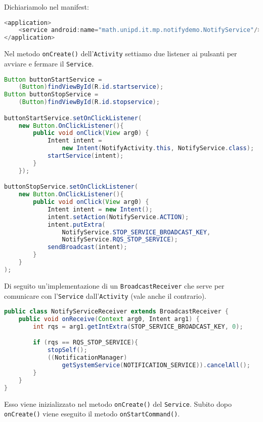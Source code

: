 Dichiariamolo nel manifest:
\begin{lstlisting}[language=Java]
<application>
	<service android:name="math.unipd.it.mp.notifydemo.NotifyService"/>
</application>
\end{lstlisting}

Nel metodo \lstinline|onCreate()| dell'\lstinline|Activity| settiamo due listener ai pulsanti per avviare e fermare il \lstinline|Service|.

\begin{lstlisting}[language=Java]
Button buttonStartService = 
	(Button)findViewById(R.id.startservice);
Button buttonStopService = 
	(Button)findViewById(R.id.stopservice);

buttonStartService.setOnClickListener(
	new Button.OnClickListener(){
		public void onClick(View arg0) {
			Intent intent = 
				new Intent(NotifyActivity.this, NotifyService.class);
			startService(intent);
		}
	});

buttonStopService.setOnClickListener(
	new Button.OnClickListener(){
		public void onClick(View arg0) {
			Intent intent = new Intent();
			intent.setAction(NotifyService.ACTION);
			intent.putExtra(
				NotifyService.STOP_SERVICE_BROADCAST_KEY, 
				NotifyService.RQS_STOP_SERVICE);
			sendBroadcast(intent);
		}
	}
);
\end{lstlisting}

Di seguito un'implementazione di un \lstinline|BroadcastReceiver| che serve per comunicare con l'\lstinline|Service| dall'\lstinline|Activity| (vale anche il contrario).
\begin{lstlisting}[language=Java]
public class NotifyServiceReceiver extends BroadcastReceiver {
	public void onReceive(Context arg0, Intent arg1) {
		int rqs = arg1.getIntExtra(STOP_SERVICE_BROADCAST_KEY, 0);

		if (rqs == RQS_STOP_SERVICE){
			stopSelf();
			((NotificationManager) 
				getSystemService(NOTIFICATION_SERVICE)).cancelAll();
		}
	}
}
\end{lstlisting}

Esso viene inizializzato nel metodo \lstinline|onCreate()| del \lstinline|Service|.
Subito dopo \lstinline|onCreate()| viene eseguito il metodo \lstinline|onStartCommand()|.


